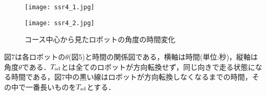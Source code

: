 
\vspace{-8mm}
\begin{figure}[!ht]
     \centering
     \texttt{[image: ssr4\_1.jpg]}
\end{figure}

\vspace{-8mm}
\begin{figure}[!ht]
     \centering
     \texttt{[image: ssr4\_2.jpg]}
     \caption{コース中心から見たロボットの角度の時間変化}
\end{figure}

図7は各ロボットの$\theta$(図5)と時間の関係図である，横軸は時間(単位:$秒$)，縦軸は角度$\theta$である．$T_{\rm sd}$とは全てのロボットが方向転換せず，同じ向きで走る状態になる時間である，図7中の黒い線はロボットが方向転換しなくなるまでの時間，その中で一番長いものを$T_{\rm sd}$とする．




